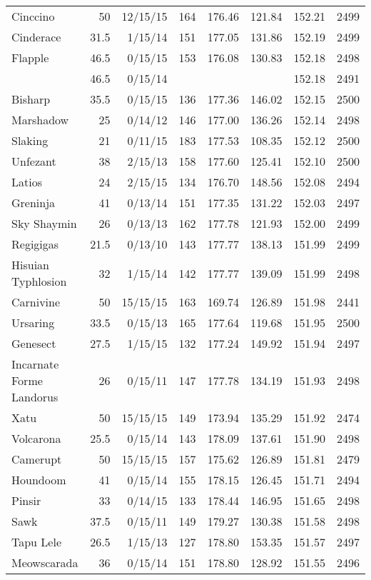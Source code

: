\begin{longtable}{lrrrrrrr}
Cinccino & 50 & 12/15/15 & 164 & 176.46 & 121.84 & 152.21 & 2499\\
Cinderace & 31.5 & 1/15/14 & 151 & 177.05 & 131.86 & 152.19 & 2499\\
Flapple & 46.5 & 0/15/15 & 153 & 176.08 & 130.83 & 152.18 & 2498\\
 & 46.5 & 0/15/14 & & & & 152.18 & 2491\\
Bisharp & 35.5 & 0/15/15 & 136 & 177.36 & 146.02 & 152.15 & 2500\\
Marshadow & 25 & 0/14/12 & 146 & 177.00 & 136.26 & 152.14 & 2498\\
Slaking & 21 & 0/11/15 & 183 & 177.53 & 108.35 & 152.12 & 2500\\
Unfezant & 38 & 2/15/13 & 158 & 177.60 & 125.41 & 152.10 & 2500\\
Latios & 24 & 2/15/15 & 134 & 176.70 & 148.56 & 152.08 & 2494\\
Greninja & 41 & 0/13/14 & 151 & 177.35 & 131.22 & 152.03 & 2497\\
Sky Shaymin & 26 & 0/13/13 & 162 & 177.78 & 121.93 & 152.00 & 2499\\
Regigigas & 21.5 & 0/13/10 & 143 & 177.77 & 138.13 & 151.99 & 2499\\
Hisuian Typhlosion & 32 & 1/15/14 & 142 & 177.77 & 139.09 & 151.99 & 2498\\
Carnivine & 50 & 15/15/15 & 163 & 169.74 & 126.89 & 151.98 & 2441\\
Ursaring & 33.5 & 0/15/13 & 165 & 177.64 & 119.68 & 151.95 & 2500\\
Genesect & 27.5 & 1/15/15 & 132 & 177.24 & 149.92 & 151.94 & 2497\\
Incarnate Forme Landorus & 26 & 0/15/11 & 147 & 177.78 & 134.19 & 151.93 & 2498\\
Xatu & 50 & 15/15/15 & 149 & 173.94 & 135.29 & 151.92 & 2474\\
Volcarona & 25.5 & 0/15/14 & 143 & 178.09 & 137.61 & 151.90 & 2498\\
Camerupt & 50 & 15/15/15 & 157 & 175.62 & 126.89 & 151.81 & 2479\\
Houndoom & 41 & 0/15/14 & 155 & 178.15 & 126.45 & 151.71 & 2494\\
Pinsir & 33 & 0/14/15 & 133 & 178.44 & 146.95 & 151.65 & 2498\\
Sawk & 37.5 & 0/15/11 & 149 & 179.27 & 130.38 & 151.58 & 2498\\
Tapu Lele & 26.5 & 1/15/13 & 127 & 178.80 & 153.35 & 151.57 & 2497\\
Meowscarada & 36 & 0/15/14 & 151 & 178.80 & 128.92 & 151.55 & 2496\\

\end{longtable}
